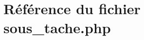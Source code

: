 \hypertarget{sous__tache_8php}{
\section{R\'{e}f\'{e}rence du fichier sous\_\-tache.php}
\label{sous__tache_8php}
}
